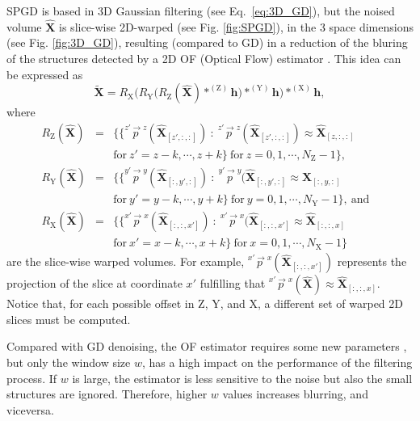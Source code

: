 \documentclass{article}
\begin{document}
SPGD is based in 3D Gaussian filtering (see Eq.~\ref{eq:3D_GD}), but
the noised volume $\hat{\mathbf{X}}$ is slice-wise 2D-warped (see
Fig. \ref{fig:SPGD}), in the 3 space dimensions (see
Fig. \ref{fig:3D_GD}), resulting (compared to GD) in a reduction of
the bluring of the structures detected by a 2D OF (Optical Flow)
estimator \cite{gonzalez2023structure}. This idea can be expressed as
\begin{equation}
  \tilde{\mathbf{X}}  = R_\text{X}\Big(R_\text{Y}\big(R_\text{Z}(\hat{\mathbf{X}})*^{(\text{Z})}{\mathbf h}\big)*^{(\text{Y})}{\mathbf h}\Big)*^{(\text{X})}{\mathbf h},
    \label{eq:SDPG}
\end{equation}
where
\begin{equation*}
    \begin{array}{rclll}
    R_\text{Z}(\hat{\mathbf{X}}) & = & \big\{ \{ \overset{z'\rightarrow z}p(\hat{\mathbf X}_{[z',:,:]})~:~\overset{z'\rightarrow z}p(\hat{\mathbf X}_{[z',:,:]})\approx\hat{\mathbf X}_{[z,:,:]} & \\ & & \text{for}
 ~z'=z-k,\cdots,z+k\} ~\text{for}~z=0,1,\cdots,N_\text{Z}-1\big\}, \\
    R_\text{Y}(\hat{\mathbf{X}}) & = & \big\{ \{ \overset{y'\rightarrow y}p(\hat{\mathbf X}_{[:,y',:]})~:~\overset{y'\rightarrow y}p(\hat{\mathbf X}_{[:,y',:]}\approx\hat{\mathbf X}_{[:,y,:]} & \\ & & \text{for}
 ~y'=y-k,\cdots,y+k\} ~\text{for}~y=0,1,\cdots,N_\text{Y}-1\big\},~\text{and} \\
    R_\text{X}(\hat{\mathbf{X}}) & = & \big\{ \{ \overset{x'\rightarrow x}p(\hat{\mathbf X}_{[:,:,x']})~:~\overset{x'\rightarrow x}p(\hat{\mathbf X}_{[:,:,x']}\approx\hat{\mathbf X}_{[:,:,x]} & \\ & & \text{for}
 ~x'=x-k,\cdots,x+k\} ~\text{for}~x=0,1,\cdots,N_\text{X}-1\big\}
    \end{array}
\end{equation*}
are the slice-wise warped volumes. For example,
$\overset{x'\rightarrow x}p(\hat{\mathbf X}_{[:,:,x']})$ represents
the projection of the slice at coordinate $x'$ fulfilling that
$\overset{x'\rightarrow x}p({\hat{\mathbf X}})\approx{\hat{\mathbf
    X}}_{[:,:,x]}$. Notice that, for each possible offset in
$\text{Z}$, $\text{Y}$, and $\text{X}$, a different set of
warped 2D slices must be computed.

Compared with GD denoising, the OF estimator requires some new
parameters \cite{farneback2003two}, but only the window size $w$, has
a high impact on the performance of the filtering process. If $w$ is
large, the estimator is less sensitive to the noise but also the small
structures are ignored. Therefore, higher $w$ values increases
blurring, and viceversa.
\end{document}
